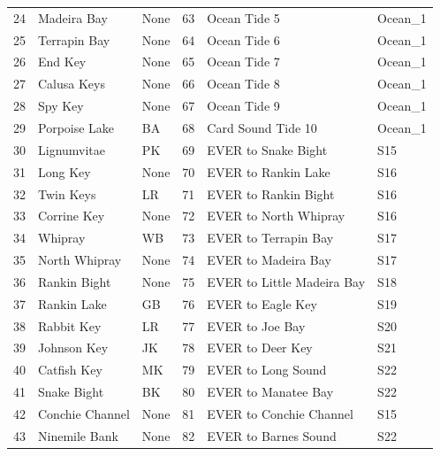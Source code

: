 \begin{table}[H]
\begin{tabular}{ l l l | l l l }
24    &  Madeira Bay             & None  & 63 & Ocean Tide 5        & Ocean\_1\\
25    &  Terrapin Bay            & None  & 64 & Ocean Tide 6        & Ocean\_1\\
26    &  End Key                 & None  & 65 & Ocean Tide 7        & Ocean\_1\\
27    &  Calusa Keys             & None  & 66 & Ocean Tide 8        & Ocean\_1\\
28    &  Spy Key                 & None  & 67 & Ocean Tide 9        & Ocean\_1\\
29    &  Porpoise Lake           & BA    & 68 & Card Sound Tide 10  & Ocean\_1\\
30    &  Lignumvitae             & PK    & 69 & EVER to Snake Bight     & S15\\
31    &  Long Key                & None  & 70 & EVER to Rankin Lake     & S16\\
32    &  Twin Keys               & LR    & 71 & EVER to Rankin Bight    & S16\\
33    &  Corrine Key             & None  & 72 & EVER to North Whipray   & S16\\
34    &  Whipray                 & WB    & 73 & EVER to Terrapin Bay    & S17\\
35    &  North Whipray           & None  & 74 & EVER to Madeira Bay     & S17\\
36    &  Rankin Bight            & None  & 75 & EVER to Little Madeira Bay & S18\\
37    & Rankin Lake              & GB    & 76 & EVER to Eagle Key       & S19\\
38    & Rabbit Key               & LR    & 77 & EVER to Joe Bay         & S20\\
39    & Johnson Key              & JK    & 78 & EVER to Deer Key        & S21\\
40    & Catfish Key              & MK    & 79 & EVER to Long Sound      & S22\\
41    & Snake Bight              & BK    & 80 & EVER to Manatee Bay     & S22\\
42    & Conchie Channel          & None  & 81 & EVER to Conchie Channel & S15\\
43    & Ninemile Bank            & None  & 82 & EVER to Barnes Sound    & S22\\
\hline
\end{tabular}
\label{table:Basins Stations}
\end{table}

